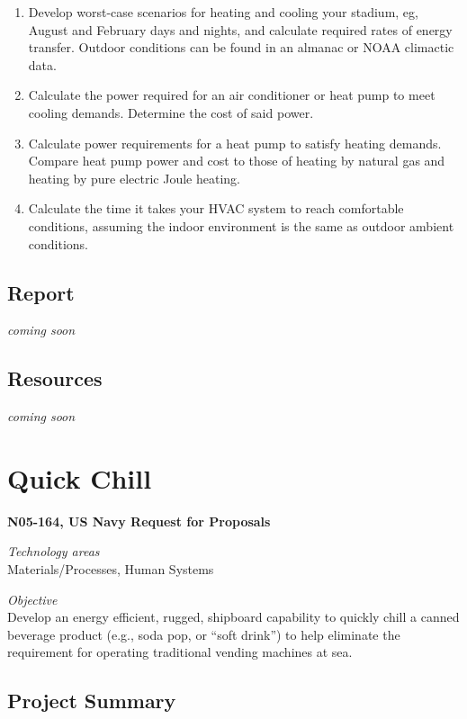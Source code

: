 \documentclass[
]{book}
\providecommand{\tightlist}{%
  \setlength{\itemsep}{0pt}\setlength{\parskip}{0pt}}
\begin{document}
\begin{enumerate}
\def\labelenumi{\arabic{enumi}.}
\tightlist
\item
  Develop worst-case scenarios for heating and cooling your stadium, eg, August and February days and nights, and calculate required rates of energy transfer. Outdoor conditions can be found in an almanac or NOAA climactic data.
\item
  Calculate the power required for an air conditioner or heat pump to meet cooling demands. Determine the cost of said power.
\item
  Calculate power requirements for a heat pump to satisfy heating demands. Compare heat pump power and cost to those of heating by natural gas and heating by pure electric Joule heating.
\item
  Calculate the time it takes your HVAC system to reach comfortable conditions, assuming the indoor environment is the same as outdoor ambient conditions.
\end{enumerate}

\hypertarget{report}{%
\section{Report}\label{report}}

\emph{coming soon}

\hypertarget{resources}{%
\section{Resources}\label{resources}}

\emph{coming soon}

\hypertarget{quick-chill}{%
\chapter{Quick Chill}\label{quick-chill}}

\textbf{N05-164, US Navy Request for Proposals}

\emph{Technology areas}\\
Materials/Processes, Human Systems

\emph{Objective}\\
Develop an energy efficient, rugged, shipboard capability to quickly chill a canned beverage product (e.g., soda pop, or ``soft drink'') to help eliminate the requirement for operating traditional vending machines at sea.

\hypertarget{project-summary}{%
\section{Project Summary}\label{project-summary}}
\end{document}
